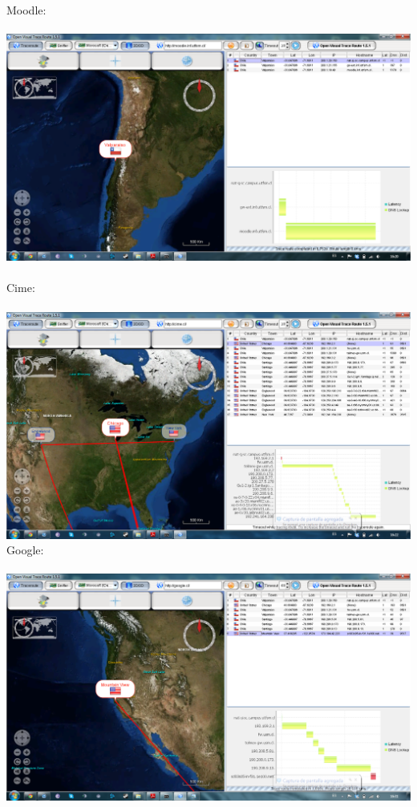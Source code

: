 \documentclass[paper=a4, fontsize=11pt]{scrartcl}
\numberwithin{equation}{section}		%
\numberwithin{figure}{section}			%
\numberwithin{table}{section}				%
\begin{document}
Moodle:\\\\
\includegraphics[width=1\textwidth]{moodle.png}\\\\
Cime:\\\\
\includegraphics[width=1\textwidth]{cime.png}
\clearpage
Google:\\\\
\includegraphics[width=1\textwidth]{google.png}\\\\
\end{document}
